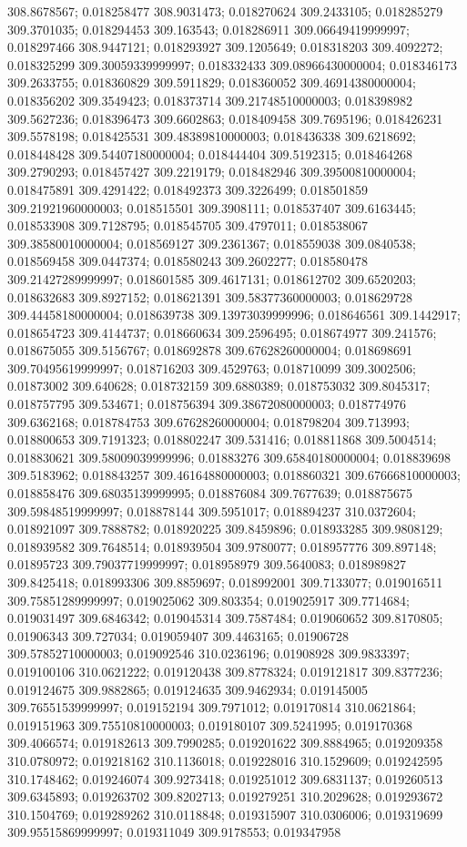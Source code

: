 308.8678567; 0.018258477 308.9031473; 0.018270624 309.2433105; 0.018285279 309.3701035; 0.018294453 309.163543; 0.018286911 309.06649419999997; 0.018297466 308.9447121; 0.018293927 309.1205649; 0.018318203 309.4092272; 0.018325299 309.30059339999997; 0.018332433 309.08966430000004; 0.018346173 309.2633755; 0.018360829 309.5911829; 0.018360052 309.46914380000004; 0.018356202 309.3549423; 0.018373714 309.21748510000003; 0.018398982 309.5627236; 0.018396473 309.6602863; 0.018409458 309.7695196; 0.018426231 309.5578198; 0.018425531 309.48389810000003; 0.018436338 309.6218692; 0.018448428 309.54407180000004; 0.018444404 309.5192315; 0.018464268 309.2790293; 0.018457427 309.2219179; 0.018482946 309.39500810000004; 0.018475891 309.4291422; 0.018492373 309.3226499; 0.018501859 309.21921960000003; 0.018515501 309.3908111; 0.018537407 309.6163445; 0.018533908 309.7128795; 0.018545705 309.4797011; 0.018538067 309.38580010000004; 0.018569127 309.2361367; 0.018559038 309.0840538; 0.018569458 309.0447374; 0.018580243 309.2602277; 0.018580478 309.21427289999997; 0.018601585 309.4617131; 0.018612702 309.6520203; 0.018632683 309.8927152; 0.018621391 309.58377360000003; 0.018629728 309.44458180000004; 0.018639738 309.13973039999996; 0.018646561 309.1442917; 0.018654723 309.4144737; 0.018660634 309.2596495; 0.018674977 309.241576; 0.018675055 309.5156767; 0.018692878 309.67628260000004; 0.018698691 309.70495619999997; 0.018716203 309.4529763; 0.018710099 309.3002506; 0.01873002 309.640628; 0.018732159 309.6880389; 0.018753032 309.8045317; 0.018757795 309.534671; 0.018756394 309.38672080000003; 0.018774976 309.6362168; 0.018784753 309.67628260000004; 0.018798204 309.713993; 0.018800653 309.7191323; 0.018802247 309.531416; 0.018811868 309.5004514; 0.018830621 309.58009039999996; 0.01883276 309.65840180000004; 0.018839698 309.5183962; 0.018843257 309.46164880000003; 0.018860321 309.67666810000003; 0.018858476 309.68035139999995; 0.018876084 309.7677639; 0.018875675 309.59848519999997; 0.018878144 309.5951017; 0.018894237 310.0372604; 0.018921097 309.7888782; 0.018920225 309.8459896; 0.018933285 309.9808129; 0.018939582 309.7648514; 0.018939504 309.9780077; 0.018957776 309.897148; 0.01895723 309.79037719999997; 0.018958979 309.5640083; 0.018989827 309.8425418; 0.018993306 309.8859697; 0.018992001 309.7133077; 0.019016511 309.75851289999997; 0.019025062 309.803354; 0.019025917 309.7714684; 0.019031497 309.6846342; 0.019045314 309.7587484; 0.019060652 309.8170805; 0.01906343 309.727034; 0.019059407 309.4463165; 0.01906728 309.57852710000003; 0.019092546 310.0236196; 0.01908928 309.9833397; 0.019100106 310.0621222; 0.019120438 309.8778324; 0.019121817 309.8377236; 0.019124675 309.9882865; 0.019124635 309.9462934; 0.019145005 309.76551539999997; 0.019152194 309.7971012; 0.019170814 310.0621864; 0.019151963 309.75510810000003; 0.019180107 309.5241995; 0.019170368 309.4066574; 0.019182613 309.7990285; 0.019201622 309.8884965; 0.019209358 310.0780972; 0.019218162 310.1136018; 0.019228016 310.1529609; 0.019242595 310.1748462; 0.019246074 309.9273418; 0.019251012 309.6831137; 0.019260513 309.6345893; 0.019263702 309.8202713; 0.019279251 310.2029628; 0.019293672 310.1504769; 0.019289262 310.0118848; 0.019315907 310.0306006; 0.019319699 309.95515869999997; 0.019311049 309.9178553; 0.019347958 